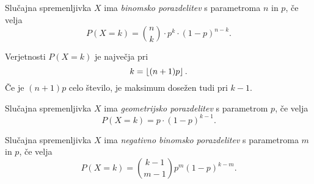 
\begin{definicija}
Slučajna spremenljivka $X$ ima
\emph{binomsko porazdelitev} s
parametroma $n$ in $p$, če velja
\[
P(X=k) = \binom{n}{k} \cdot p^k \cdot (1-p)^{n-k}.
\]
\end{definicija}

\begin{opomba}
Verjetnosti $P(X=k)$ je največja pri
\[
k = \left\lfloor (n+1)p\right\rfloor.
\]
Če je $(n+1)p$ celo število, je maksimum dosežen tudi pri $k-1$.
\end{opomba}

\begin{definicija}
Slučajna spremenljivka $X$ ima
\emph{geometrijsko porazdelitev} s
parametrom $p$, če velja
\[
P(X=k) = p \cdot (1-p)^{k-1}.
\]
\end{definicija}

\begin{definicija}
Slučajna spremenljivka $X$ ima
\emph{negativno binomsko porazdelitev}
s parametroma $m$ in $p$, če velja
\[
P(X=k) = \binom{k-1}{m-1} p^m (1-p)^{k-m}.
\]
\end{definicija}
